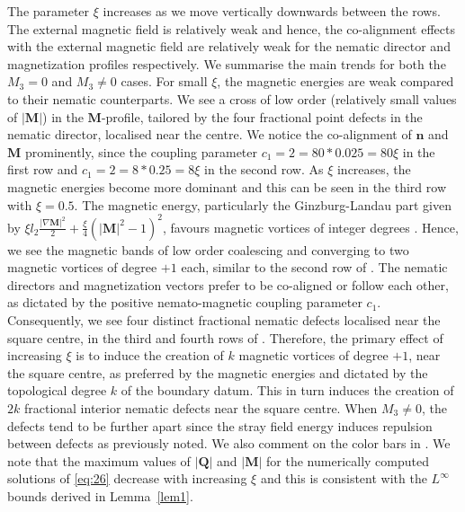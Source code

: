 \documentclass{article}
\def\Qvec{\mathbf{Q}}
\def \Mvec{\mathbf{M}}
\def\nvec{\mathbf{n}}
\begin{document}
The parameter $\xi$ increases as we move vertically downwards between the rows. The external magnetic field is relatively weak and hence, the co-alignment effects with the external magnetic field are relatively weak for the nematic director and magnetization profiles respectively. We summarise the main trends for both the $M_3=0$ and $M_3 \neq 0$ cases. For small $\xi$, the magnetic energies are weak compared to their nematic counterparts. We see a cross of low order (relatively small values of $|\Mvec|$) in the $\Mvec$-profile, tailored by the four fractional point defects in the nematic director, localised near the centre. We notice the co-alignment of $\nvec$ and $\Mvec$ prominently, since the coupling parameter $c_1= 2 = 80 * 0.025 = 80 \xi$ in the first row and $c_1 = 2 = 8 * 0.25= 8 \xi$ in the second row. As $\xi$ increases, the magnetic energies become more dominant and this can be seen in the third row with $\xi =0.5$. The magnetic energy, particularly the Ginzburg-Landau part given by $\xi l_2 \frac{|\nabla \Mvec|^2}{2} + \frac{\xi}{4}\left(|\Mvec|^2 - 1 \right)^2$, favours magnetic vortices of integer degrees \cite{bethuel1994ginzburg}. Hence, we see the magnetic bands of low order coalescing and converging to two magnetic vortices of degree $+1$ each, similar to the second row of . The nematic directors and magnetization vectors prefer to be co-aligned or follow each other, as dictated by the positive nemato-magnetic coupling parameter $c_1$. Consequently, we see four distinct fractional nematic defects localised near the square centre, in the third and fourth rows of . Therefore, the primary effect of increasing $\xi$ is to induce the creation of $k$ magnetic vortices of degree $+1$, near the square centre, as preferred by the magnetic energies and dictated by the topological degree $k$ of the boundary datum. This in turn induces the creation of $2k$ fractional interior nematic defects near the square centre. When $M_3 \neq 0$, the defects tend to be further apart since the stray field energy induces repulsion between defects as previously noted. We also comment on the color bars in . We note that the maximum values of $|\Qvec|$ and $|\Mvec|$ for the numerically computed solutions of \eqref{eq:26} decrease with increasing $\xi$ and this is consistent with the $L^\infty$ bounds derived in Lemma~\ref{lem1}.  
\end{document}
